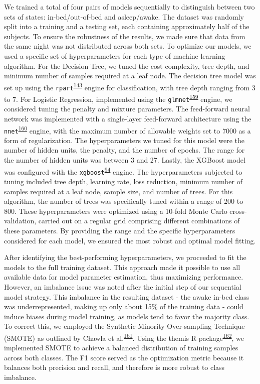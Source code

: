 \documentclass[
  10pt,
]{scrbook}
\begin{document}
We trained a total of four pairs of models sequentially to distinguish
between two sets of states: in-bed/out-of-bed and asleep/awake. The
dataset was randomly split into a training and a testing set, each
containing approximately half of the subjects. To ensure the robustness
of the results, we made sure that data from the same night was not
distributed across both sets. To optimize our models, we used a specific
set of hyperparameters for each type of machine learning algorithm. For
the Decision Tree, we tuned the cost complexity, tree depth, and minimum
number of samples required at a leaf node. The decision tree model was
set up using the
\texttt{rpart}\textsuperscript{\protect\hyperlink{ref-rpart}{143}}
engine for classification, with tree depth ranging from 3 to 7. For
Logistic Regression, implemented using the
\texttt{glmnet}\textsuperscript{\protect\hyperlink{ref-friedman_glmnet_2010}{159}}
engine, we considered tuning the penalty and mixture parameters. The
feed-forward neural network was implemented with a single-layer
feed-forward architecture using the
\texttt{nnet}\textsuperscript{\protect\hyperlink{ref-nnet}{160}} engine,
with the maximum number of allowable weights set to 7000 as a form of
regularization. The hyperparameters we tuned for this model were the
number of hidden units, the penalty, and the number of epochs. The range
for the number of hidden units was between 3 and 27. Lastly, the XGBoost
model was configured with the
\texttt{xgboost}\textsuperscript{\protect\hyperlink{ref-xgboost}{94}}
engine. The hyperparameters subjected to tuning included tree depth,
learning rate, loss reduction, minimum number of samples required at a
leaf node, sample size, and number of trees. For this algorithm, the
number of trees was specifically tuned within a range of 200 to 800.
These hyperparameters were optimized using a 10-fold Monte Carlo
cross-validation, carried out on a regular grid comprising different
combinations of these parameters. By providing the range and the
specific hyperparameters considered for each model, we ensured the most
robust and optimal model fitting.

After identifying the best-performing hyperparameters, we proceeded to
fit the models to the full training dataset. This approach made it
possible to use all available data for model parameter estimation, thus
maximizing performance. However, an imbalance issue was noted after the
initial step of our sequential model strategy. This imbalance in the
resulting dataset - the awake in-bed class was underrepresented, making
up only about 15\% of the training data - could induce biases during
model training, as models tend to favor the majority class. To correct
this, we employed the Synthetic Minority Over-sampling Technique (SMOTE)
as outlined by Chawla et
al.\textsuperscript{\protect\hyperlink{ref-chawla_smote_2002}{161}}.
Using the themis R
package\textsuperscript{\protect\hyperlink{ref-themis}{162}}, we
implemented SMOTE to achieve a balanced distribution of training samples
across both classes. The F1 score served as the optimization metric
because it balances both precision and recall, and therefore is more
robust to class imbalance.
\end{document}
